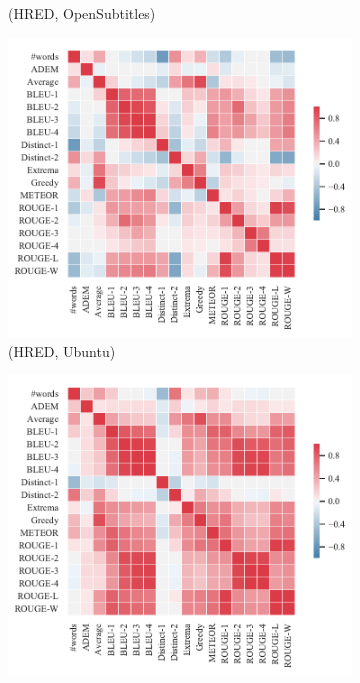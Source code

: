 \begin{figure}[htbp]
\begin{subfigure}{0.33\linewidth}
        \caption{(HRED, OpenSubtitles)}
    \end{subfigure}%
    \begin{subfigure}{0.33\linewidth}
        \centering
        \includegraphics[width=\linewidth]{figure/plot/heatmap/v4/pearson/hred/ubuntu/plot.pdf}
        \caption{(HRED, Ubuntu)}
    \end{subfigure}
    \begin{subfigure}{0.33\linewidth}
        \centering
        \includegraphics[width=\linewidth]{figure/plot/heatmap/v4/pearson/vhred/lsdscc/plot.pdf}

\end{subfigure}
\end{figure}
